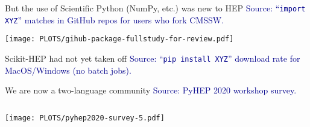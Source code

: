 \documentclass[aspectratio=169]{beamer}
\begin{document}
\begin{frame}{But the use of Scientific Python (NumPy, etc.) was new to HEP}
\vspace{0.25 cm}
\textcolor{darkblue}{Source: ``\texttt{import XYZ}'' matches in GitHub repos for users who fork CMSSW.}

\texttt{[image: PLOTS/gihub-package-fullstudy-for-review.pdf]}
\end{frame}

\begin{frame}{Scikit-HEP had not yet taken off}
\vspace{0.25 cm}
\textcolor{darkblue}{Source: ``\texttt{pip install XYZ}'' download rate for MacOS/Windows (no batch jobs).}

\vspace{0.1 cm}
\end{frame}

\begin{frame}{We are now a two-language community}
\vspace{0.25 cm}
\textcolor{darkblue}{Source: PyHEP 2020 workshop survey.}

\vspace{-0.3 cm}
\begin{columns}
\texttt{[image: PLOTS/pyhep2020-survey-5.pdf]}
\end{columns}
\end{frame}
\end{document}
